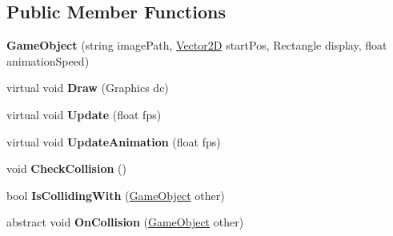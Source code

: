 \subsection*{Public Member Functions}
\begin{DoxyCompactItemize}
\item 
\hypertarget{class_mage_twinstick_1_1_game_object_a70fd6f506e37d368c4b5dc324286e0ec}{}{\bfseries Game\+Object} (string image\+Path, \hyperlink{class_mage_twinstick_1_1_vector2_d}{Vector2\+D} start\+Pos, Rectangle display, float animation\+Speed)\label{class_mage_twinstick_1_1_game_object_a70fd6f506e37d368c4b5dc324286e0ec}

\item 
\hypertarget{class_mage_twinstick_1_1_game_object_a11628f4d9b508e2d976ca25f716b74f5}{}virtual void {\bfseries Draw} (Graphics dc)\label{class_mage_twinstick_1_1_game_object_a11628f4d9b508e2d976ca25f716b74f5}

\item 
\hypertarget{class_mage_twinstick_1_1_game_object_a3de8248d06d234f8335525bbb28ccacc}{}virtual void {\bfseries Update} (float fps)\label{class_mage_twinstick_1_1_game_object_a3de8248d06d234f8335525bbb28ccacc}

\item 
\hypertarget{class_mage_twinstick_1_1_game_object_a35d6d9af3335b978c618ab73da1215a0}{}virtual void {\bfseries Update\+Animation} (float fps)\label{class_mage_twinstick_1_1_game_object_a35d6d9af3335b978c618ab73da1215a0}

\item 
\hypertarget{class_mage_twinstick_1_1_game_object_a5ed64726e236792a162c2899b7446d66}{}void {\bfseries Check\+Collision} ()\label{class_mage_twinstick_1_1_game_object_a5ed64726e236792a162c2899b7446d66}

\item 
\hypertarget{class_mage_twinstick_1_1_game_object_a024097f67b0a8b2f38451e8df05b6b1d}{}bool {\bfseries Is\+Colliding\+With} (\hyperlink{class_mage_twinstick_1_1_game_object}{Game\+Object} other)\label{class_mage_twinstick_1_1_game_object_a024097f67b0a8b2f38451e8df05b6b1d}

\item 
\hypertarget{class_mage_twinstick_1_1_game_object_a60f894a5ff911af7bfe3e4bd8abf253f}{}abstract void {\bfseries On\+Collision} (\hyperlink{class_mage_twinstick_1_1_game_object}{Game\+Object} other)\label{class_mage_twinstick_1_1_game_object_a60f894a5ff911af7bfe3e4bd8abf253f}

\end{DoxyCompactItemize}
